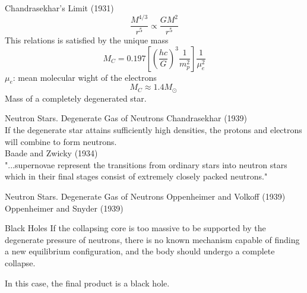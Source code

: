 \documentclass{beamer}
\begin{document}
\begin{frame}{Chandrasekhar's Limit (1931)}
	\onslide<1-> 
    $$\frac{M^{4/3}}{r^5} \propto \frac{GM^2}{r^5} $$
     This relations is satisfied by the unique mass
    $$M_C = 0.197 \left[ 
    	\left( \frac{hc}{G}\right)^3 \frac{1}{m_p^2} \right] \frac{1}{\mu^2_e}$$
     $\mu_e$: mean molecular wight of the electrons
	\onslide<4-> 
	$$M_C \approx 1.4 M_\odot\ $$
    Mass of a completely degenerated star.
\end{frame}

\begin{frame}{Neutron Stars. Degenerate Gas of Neutrons}
	\onslide<1-> Chandrasekhar (1939)\\
     If the degenerate star attains sufficiently high densities, the protons and electrons will combine to form neutrons.\\
    \bigskip
     Baade and Zwicky (1934)\\
	\onslide<4-> "...supernovae represent the transitions from ordinary stars into neutron stars which in their final stages consist of extremely closely packed neutrons."\\
\end{frame}
        
\begin{frame}{Neutron Stars. Degenerate Gas of Neutrons}
	\onslide<1-> 
    Oppenheimer and Volkoff (1939)\\
    Oppenheimer and Snyder (1939)\\
     
\end{frame}

\begin{frame}{Black Holes}
	If the collapsing core is too massive to be supported by the degenerate pressure of neutrons, there is no known mechanism capable of finding a new equilibrium configuration, and the body should undergo a complete collapse.
    \bigskip
    
    In this case, the final product is a black hole.
\end{frame}
\end{document}
